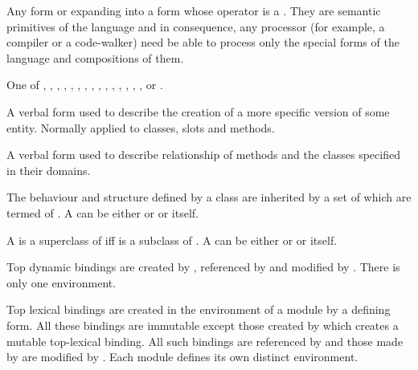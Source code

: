 \begin{optDefinition}
\begin{definitions}
      Any form or
     expanding into a form whose operator is a .  They are semantic primitives of the language and in
    consequence, any processor (for example, a compiler or a code-walker) need
    be able to process only the special forms of the language and compositions
    of them.

      One of
    , ,
    , ,
    , , ,
    , , ,
    , , ,
    , , or
    .

     A verbal form used to
    describe the creation of a more specific version of some entity.  Normally
    applied to classes, slots and methods.

     A verbal form used
    to describe relationship of methods and the classes specified in their
    domains.

      The behaviour and structure
    defined by a class  are inherited by a set of 
    which are termed  of .  A  can
    be either  or  or itself.

      A  is a
    superclass of  iff  is a subclass of
    .  A  can be either  or
     or itself.

     Top dynamic bindings
    are created by , referenced by 
    and modified by .  There is only one  environment.

     Top lexical bindings
    are created in the   environment of a module by a
    defining form.  All these bindings are immutable except those created by
     which creates a mutable top-lexical binding.  All such
    bindings are referenced by  and those made by
     are modified by .  Each module defines
    its own distinct  environment.
%
\end{definitions}
\end{optDefinition}
